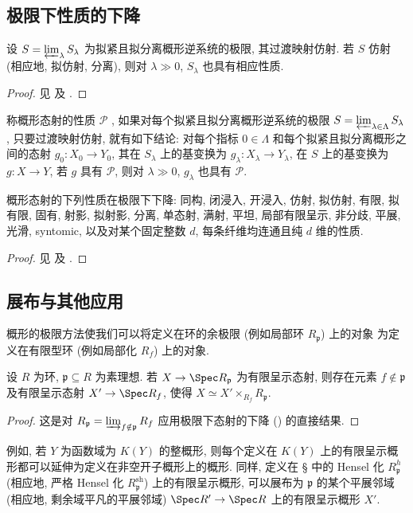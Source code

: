 \subsection{极限下性质的下降}\label{src:B.3.2-subsection}
\begin{proposition}[极限下概形性质的下降]\label{src:B.3.5}
设 $S=\varprojlim_\lambda S_\lambda$ 为拟紧且拟分离概形逆系统的极限, 其过渡映射仿射. 若 $S$ 仿射 (相应地, 拟仿射, 分离), 则对 $\lambda\gg0$, $S_\lambda$ 也具有相应性质.
\end{proposition}
\begin{proof}
见 \cite[Tags 01Z6, 086Q 及 01Z5]{SP} 及 \cite[命题 C.$6$--$7$]{TT90}.
\end{proof}
\begin{definition}\label{src:B.3.6}
称概形态射的性质 $\mathcal P$ , 如果对每个拟紧且拟分离概形逆系统的极限 $S=\varprojlim_{\lambda\in\Lambda}S_\lambda$, 只要过渡映射仿射, 就有如下结论: 对每个指标 $0\in\Lambda$ 和每个拟紧且拟分离概形之间的态射 $g_0:X_0\to Y_0$, 其在 $S_\lambda$ 上的基变换为 $g_\lambda:X_\lambda\to Y_\lambda$, 在 $S$ 上的基变换为 $g:X\to Y$, 若 $g$ 具有 $\mathcal P$, 则对 $\lambda\gg0$, $g_\lambda$ 也具有 $\mathcal P$.
\end{definition}
\begin{proposition}[极限下态射性质的下降]\label{src:B.3.7}
概形态射的下列性质在极限下下降: 同构, 闭浸入, 开浸入, 仿射, 拟仿射, 有限, 拟有限, 固有, 射影, 拟射影, 分离, 单态射, 满射, 平坦, 局部有限呈示, 非分歧, 平展, 光滑, syntomic, 以及对某个固定整数 $d$, 每条纤维均连通且纯 $d$ 维的性质.
\end{proposition}
\begin{proof}
见 \cite[IV $8.10.5$]{EGA} 及 \cite[Tags 081C 及 05M5]{SP}.
\end{proof}

\subsection{展布与其他应用}\label{src:B.3.3-subsection}
概形的极限方法使我们可以将定义在环的余极限 (例如局部环 $R_{\mathfrak p}$) 上的对象 为定义在有限型环 (例如局部化 $R_f$) 上的对象.
\begin{proposition}[展布]\label{src:B.3.8}
设 $R$ 为环, $\mathfrak p\subseteq R$ 为素理想. 若 $X\to\Spec R_{\mathfrak p}$ 为有限呈示态射, 则存在元素 $f\notin\mathfrak p$ 及有限呈示态射 $X'\to\Spec R_f$, 使得 $X\simeq X'\times_{R_f}R_{\mathfrak p}$.
\end{proposition}
\begin{proof}
这是对 $R_{\mathfrak p}=\varinjlim_{f\notin\mathfrak p}R_f$ 应用极限下态射的下降 () 的直接结果.
\end{proof}
例如, 若 $Y$ 为函数域为 $K(Y)$ 的整概形, 则每个定义在 $K(Y)$ 上的有限呈示概形都可以延伸为定义在非空开子概形上的概形. 同样, 定义在 \S{} 中的 Hensel 化 $R^h_{\mathfrak p}$ (相应地, 严格 Hensel 化 $R^{\mathrm{sh}}_{\mathfrak p}$) 上的有限呈示概形, 可以展布为 $\mathfrak p$ 的某个平展邻域 (相应地, 剩余域平凡的平展邻域) $\Spec R'\to\Spec R$ 上的有限呈示概形 $X'$.

